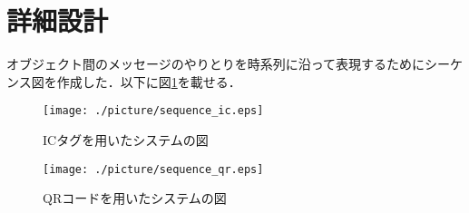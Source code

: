 

\section{詳細設計}

オブジェクト間のメッセージのやりとりを時系列に沿って表現するためにシーケンス図を作成した．以下に図\ref{sequence_ic}を載せる．

\begin{figure}[htbp]
\centering
\texttt{[image: ./picture/sequence\_ic.eps]}
\caption{ICタグを用いたシステムの図}
\label{sequence_ic}
\end{figure}

\begin{figure}[htbp]
\centering
\texttt{[image: ./picture/sequence\_qr.eps]}
\caption{QRコードを用いたシステムの図}
\label{sequence_qr}
\end{figure}